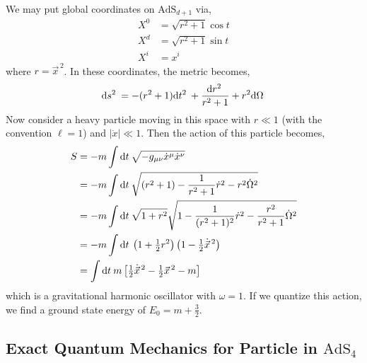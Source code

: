 \documentclass[12pt]{extarticle}
\newcommand{\AdS}[1]{\mathrm{AdS}_{#1}}
\begin{document}
We may put global coordinates on $\AdS{d+1}$ via,
\begin{align*}
X^0 & = \sqrt{r^2 + 1} \cos{t} 
\\
X^d & = \sqrt{r^2 + 1} \sin{t} 
\\
X^i & = x^i
\end{align*} 
where $r = \vec{x}^{\, 2}$.
In these coordinates, the metric becomes,
\[ \mathrm{d}s^2 \: = - (r^2 + 1) \mathrm{d}t^2 \: + \frac{\mathrm{d}r^2 \:}{r^2 + 1} + r^2 \mathrm{d}\Omega \: \]
Now consider a heavy particle moving in this space with $r \ll 1$ (with the convention $\ell = 1$) and $|\dot{x}| \ll 1$. Then the action of this particle becomes,
\begin{align*}
S & = - m \int \mathrm{d}t \: \sqrt{- g_{\mu \nu} \dot{x}^\mu \dot{x}^\nu} 
\\
& = - m \int \mathrm{d}t \: \sqrt{(r^2 + 1) - \frac{1}{r^2 + 1} \dot{r}^2 - r^2 \dot{\Omega}^2}
\\
& = - m \int \mathrm{d}t \: \sqrt{1 + r^2} \sqrt{1 - \frac{1}{(r^2 + 1)^2} \dot{r}^2 - \frac{r^2}{r^2 + 1} \dot{\Omega}^2}
\\
& = - m \int \mathrm{d}t \: \left( 1 + \tfrac{1}{2} r^2 \right) \left( 1 - \tfrac{1}{2} \dot{\vec{x}}^{\, 2} \right)
\\
& = \int \mathrm{d}t \: m \left[ \tfrac{1}{2} \dot{\vec{x}}^{\, 2} - \tfrac{1}{2} \vec{x}^{\, 2} - m  \right]
\end{align*}
which is a gravitational harmonic oscillator with $\omega = 1$. If we quantize this action, we find a ground state energy of $E_0 = m + \frac{3}{2}$.  

\subsection{Exact Quantum Mechanics for Particle in $\AdS{4}$}
\end{document}
